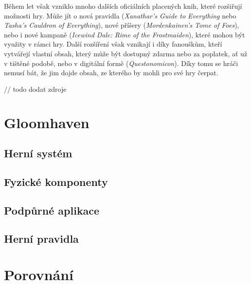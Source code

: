 Během let však vzniklo mnoho dalších oficiálních placených knih, které rozšiřují možnosti hry. Může jít o nová pravidla (\textit{Xanathar's Guide to Everything} nebo \textit{Tasha's Cauldron of Everything}), nové příšery (\textit{Mordenkainen's Tome of Foes}), nebo i nové kampaně (\textit{Icewind Dale: Rime of the Frostmaiden}), které mohou být využity v rámci hry. Další rozšíření však vznikají i díky fanouškům, kteří vytvářejí vlastní obsah, který může být dostupný zdarma nebo za poplatek, ať už v tištěné podobě, nebo v digitální formě (\textit{Questonomicon}). Díky tomu se hráči nemusí bát, že jim dojde obsah, ze kterého by mohli pro své hry čerpat.

// todo dodat zdroje



\section{Gloomhaven}
\label{sec:gloomhaven}

\subsection{Herní systém}
\label{subsec:gh_gameplay}

\subsection{Fyzické komponenty}
\label{subsec:gh_components}

\subsection{Podpůrné aplikace}
\label{subsec:gh_apps}

\subsection{Herní pravidla}
\label{subsec:gh_rules}



\section{Porovnání}
\label{sec:comparison}